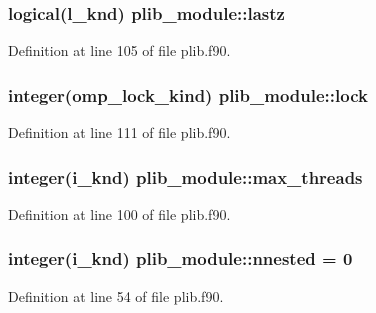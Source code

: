 \hypertarget{classplib__module_a5d6addca95cdb6299949d278355bed3b}{
\subsubsection[{lastz}]{\setlength{\rightskip}{0pt plus 5cm}logical(l\-\_\-knd) plib\-\_\-module\-::lastz}}\label{classplib__module_a5d6addca95cdb6299949d278355bed3b}


Definition at line 105 of file plib.\-f90.

\hypertarget{classplib__module_a3f4964cd381feb76e21407e3b96915c9}{
\subsubsection[{lock}]{\setlength{\rightskip}{0pt plus 5cm}integer(omp\-\_\-lock\-\_\-kind) plib\-\_\-module\-::lock}}\label{classplib__module_a3f4964cd381feb76e21407e3b96915c9}


Definition at line 111 of file plib.\-f90.

\hypertarget{classplib__module_aac421ecf4251867c4bff7045095d596c}{
\subsubsection[{max\-\_\-threads}]{\setlength{\rightskip}{0pt plus 5cm}integer(i\-\_\-knd) plib\-\_\-module\-::max\-\_\-threads}}\label{classplib__module_aac421ecf4251867c4bff7045095d596c}


Definition at line 100 of file plib.\-f90.

\hypertarget{classplib__module_a1fc540917e4a4c7e8677f74d81a58fc4}{
\subsubsection[{nnested}]{\setlength{\rightskip}{0pt plus 5cm}integer(i\-\_\-knd) plib\-\_\-module\-::nnested = 0}}\label{classplib__module_a1fc540917e4a4c7e8677f74d81a58fc4}


Definition at line 54 of file plib.\-f90.

